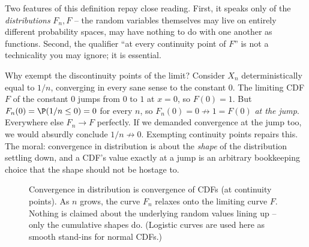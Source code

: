 Two features of this definition repay close reading. First, it speaks only of the
\emph{distributions} $F_n, F$ -- the random variables themselves may live on entirely
different probability spaces, may have nothing to do with one another as functions.
Second, the qualifier ``at every continuity point of $F$'' is not a technicality you
may ignore; it is essential.

\begin{whybox}
Why exempt the discontinuity points of the limit? Consider $X_n$ deterministically
equal to $1/n$, converging in every sane sense to the constant $0$. The limiting CDF
$F$ of the constant $0$ jumps from $0$ to $1$ at $x=0$, so $F(0)=1$. But
$F_n(0)=\P(1/n\le0)=0$ for every $n$, so $F_n(0)=0\not\to1=F(0)$ \emph{at the jump}.
Everywhere else $F_n\to F$ perfectly. If we demanded convergence at the jump too, we
would absurdly conclude $1/n\not\to0$. Exempting continuity points repairs this. The
moral: convergence in distribution is about the \emph{shape} of the distribution
settling down, and a CDF's value exactly at a jump is an arbitrary bookkeeping choice
that the shape should not be hostage to.
\end{whybox}

\begin{figure}[H]
\centering
{}
\caption{Convergence in distribution is convergence of CDFs (at continuity points).
As $n$ grows, the curve $F_n$ relaxes onto the limiting curve $F$. Nothing is claimed
about the underlying random values lining up -- only the cumulative shapes do.
(Logistic curves are used here as smooth stand-ins for normal CDFs.)}
\label{ch22:fig-cdf-conv}
\end{figure}


